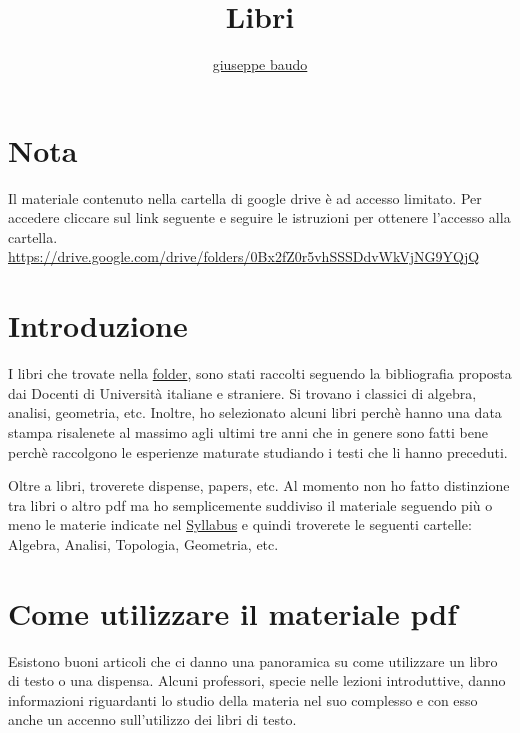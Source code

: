 \documentclass[a4paper,10pt]{article}
\title{Libri}
\author{\href{http://www.baudo.hol.es}{giuseppe baudo}}
\begin{document}
\maketitle

\section*{Nota}
Il materiale contenuto nella cartella di google drive è ad accesso limitato. Per accedere cliccare sul link seguente e seguire le istruzioni per ottenere
l'accesso alla cartella. \url{https://drive.google.com/drive/folders/0Bx2fZ0r5vhSSSDdvWkVjNG9YQjQ}

\section*{Introduzione}
I libri che trovate nella \href{https://drive.google.com/drive/folders/0Bx2fZ0r5vhSSSDdvWkVjNG9YQjQ}{folder}, sono stati raccolti seguendo la bibliografia proposta dai Docenti di Università
italiane e straniere. Si trovano i classici di algebra, analisi, geometria, etc. Inoltre, ho selezionato alcuni libri perchè hanno una data stampa risalenete al massimo
agli ultimi tre anni che in genere sono fatti bene perchè raccolgono le esperienze maturate studiando i testi che li hanno preceduti.

Oltre a libri, troverete dispense, papers, etc. Al momento non ho fatto distinzione tra libri o altro pdf ma ho semplicemente suddiviso il materiale seguendo
più o meno le materie indicate nel \href{Syllabus.html}{Syllabus} e quindi troverete le seguenti cartelle: Algebra, Analisi, Topologia, Geometria, etc.

\section*{Come utilizzare il materiale pdf}
Esistono buoni articoli che ci danno una panoramica su come utilizzare un libro di testo o una dispensa. Alcuni professori, specie nelle lezioni introduttive, danno
informazioni riguardanti lo studio della materia nel suo complesso e con esso anche un accenno sull'utilizzo dei libri di testo.
\end{document}

